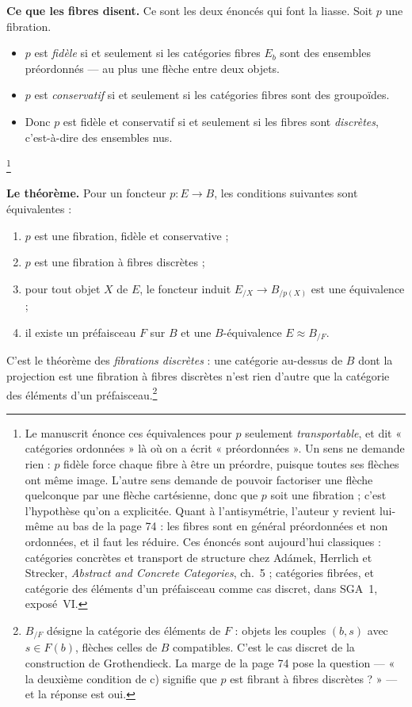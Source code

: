 \documentclass[11pt,a4paper]{article}
\begin{document}
\textbf{Ce que les fibres disent.} Ce sont les deux énoncés qui font la liasse.
Soit $p$ une fibration.

\begin{itemize}
\item $p$ est \emph{fidèle} si et seulement si les catégories fibres $E_{b}$
sont des ensembles préordonnés — au plus une flèche entre deux objets.
\item $p$ est \emph{conservatif} si et seulement si les catégories fibres sont
des groupoïdes.
\item Donc $p$ est fidèle et conservatif si et seulement si les fibres sont
\emph{discrètes}, c'est-à-dire des ensembles nus.
\end{itemize}

\footnote{Le manuscrit énonce ces équivalences pour $p$ seulement
\emph{transportable}, et dit « catégories ordonnées » là où on a écrit
« préordonnées ». Un sens ne demande rien : $p$ fidèle force chaque fibre à
être un préordre, puisque toutes ses flèches ont même image. L'autre sens
demande de pouvoir factoriser une flèche quelconque par une flèche cartésienne,
donc que $p$ soit une fibration ; c'est l'hypothèse qu'on a explicitée. Quant à
l'antisymétrie, l'auteur y revient lui-même au bas de la page 74 : les fibres
sont en général préordonnées et non ordonnées, et il faut les réduire. Ces
énoncés sont aujourd'hui classiques : catégories concrètes et transport de
structure chez Adámek, Herrlich et Strecker, \emph{Abstract and Concrete
Categories}, ch.~5 ; catégories fibrées, et catégorie des éléments d'un
préfaisceau comme cas discret, dans SGA~1, exposé~VI.}


\textbf{Le théorème.} Pour un foncteur $p : E \to B$, les conditions suivantes
sont équivalentes :

\begin{enumerate}
\item[a)] $p$ est une fibration, fidèle et conservative ;
\item[b)] $p$ est une fibration à fibres discrètes ;
\item[c)] pour tout objet $X$ de $E$, le foncteur induit
$E_{/X} \to B_{/p(X)}$ est une équivalence ;
\item[d)] il existe un préfaisceau $F$ sur $B$ et une $B$-équivalence
$E \approx B_{/F}$.
\end{enumerate}

C'est le théorème des \emph{fibrations discrètes} : une catégorie au-dessus de
$B$ dont la projection est une fibration à fibres discrètes n'est rien d'autre
que la catégorie des éléments d'un préfaisceau.\footnote{$B_{/F}$ désigne la
catégorie des éléments de $F$ : objets les couples $(b, s)$ avec $s \in F(b)$,
flèches celles de $B$ compatibles. C'est le cas discret de la construction de
Grothendieck. La marge de la page 74 pose la question — « la deuxième condition
de c) signifie que $p$ est fibrant à fibres discrètes ? » — et la réponse est
oui.}
\end{document}
